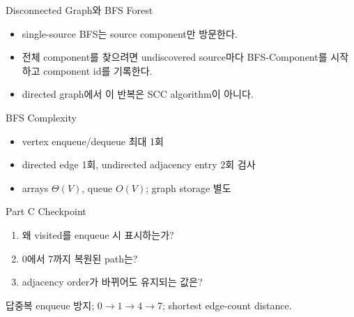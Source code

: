 \begin{frame}{Disconnected Graph와 BFS Forest}
\begin{itemize}\item single-source BFS는 source component만 방문한다.\item 전체 component를 찾으려면 undiscovered source마다 BFS-Component를 시작하고 component id를 기록한다.\item directed graph에서 이 반복은 SCC algorithm이 아니다.\end{itemize}
\end{frame}
\begin{frame}{BFS Complexity}
\begin{itemize}\item vertex enqueue/dequeue 최대 1회\item directed edge 1회, undirected adjacency entry 2회 검사\item arrays \(\Theta(V)\), queue \(O(V)\); graph storage 별도\end{itemize}
\end{frame}
\begin{frame}{Part C Checkpoint}
\begin{enumerate}\item 왜 visited를 enqueue 시 표시하는가?\item 0에서 7까지 복원된 path는?\item adjacency order가 바뀌어도 유지되는 값은?\end{enumerate}
\begin{exampleblock}{답}중복 enqueue 방지; \(0\to1\to4\to7\); shortest edge-count distance.\end{exampleblock}
\end{frame}
